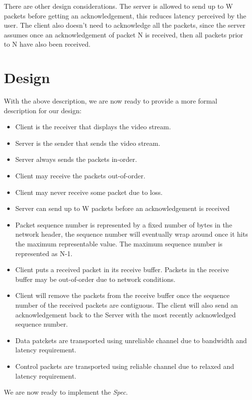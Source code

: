 There are other design considerations. The server is allowed to send up to W
packets before getting an acknowledgement, this reduces latency perceived by the
user. The client also doesn't need to acknowledge all the packets, since the
server assumes once an acknowledgement of packet N is received, then all packets
prior to N have also been received.

\section{Design}

With the above description, we are now ready to provide a more formal
description for our design:

\begin{itemize}
    \item Client is the receiver that displays the video stream.
    \item Server is the sender that sends the video stream.
    \item Server always sends the packets in-order.
    \item Client may receive the packets out-of-order.
    \item Client may never receive some packet due to loss.
    \item Server can send up to W packets before an acknowledgement is received
    \item Packet sequence number is represented by a fixed number of bytes in
    the network header, the sequence number will eventually wrap around once it
    hits the maximum representable value. The maximum sequence number is
    represented as N-1. 
    \item Client puts a received packet in its receive buffer. Packets in the 
    receive buffer may be out-of-order due to network conditions.
    \item Client will remove the packets from the receive buffer once the
    sequence number of the received packets are contiguous. The client will also
    send an acknowledgement back to the Server with the most recently
    acknowledged sequence number.
    \item Data patckets are transported using unreliable channel due to
    bandwidth and latency requirement.
    \item Control packets are transported using reliable channel due to relaxed 
    and latency requirement. 
\end{itemize}

We are now ready to implement the \textit{Spec}. 

